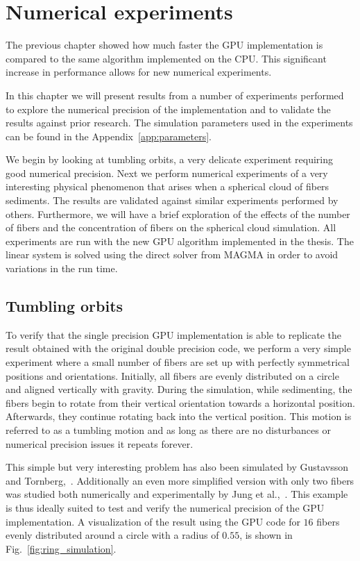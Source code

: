 \chapter{Numerical experiments}
\label{cha:experiments}

The previous chapter showed how much faster the GPU implementation is compared to the same algorithm implemented on the CPU. This significant increase in performance allows for new numerical experiments.

In this chapter we will present results from a number of experiments performed to explore the numerical precision of the implementation and to validate the results against prior research. The simulation parameters used in the experiments can be found in the Appendix~\ref{app:parameters}.

We begin by looking at tumbling orbits, a very delicate experiment requiring good numerical precision. Next we perform numerical experiments of a very interesting physical phenomenon that arises when a spherical cloud of fibers sediments. The results are validated against similar experiments performed by others. Furthermore, we will have a brief exploration of the effects of the number of fibers and the concentration of fibers on the spherical cloud simulation. All experiments are run with the new GPU algorithm  implemented in the thesis. The linear system is solved using the direct solver from MAGMA in order to avoid variations in the run time.

\section{Tumbling orbits}
\label{sec:example_ring}

To verify that the single precision GPU implementation is able to replicate the result obtained with the original double precision code, we perform a very simple experiment where a small number of fibers are set up with perfectly symmetrical positions and orientations. Initially, all fibers are evenly distributed on a circle and aligned vertically with gravity. During the simulation, while sedimenting, the fibers begin to rotate from their vertical orientation towards a horizontal position. Afterwards, they continue rotating back into the vertical position. This motion is referred to as a tumbling motion and as long as there are no disturbances or numerical precision issues it repeats forever.

This simple but very interesting problem has also been simulated by Gustavsson and Tornberg,~\cite{Gustavsson2009}. Additionally an even more simplified version with only two fibers was studied both numerically and experimentally by Jung et al.,~\cite{Jung2006}. This example is thus ideally suited to test and verify the numerical precision of the GPU implementation. A visualization of the result using the GPU code for $16$ fibers evenly distributed around a circle with a radius of $0.55$, is shown in Fig.~\ref{fig:ring_simulation}.

